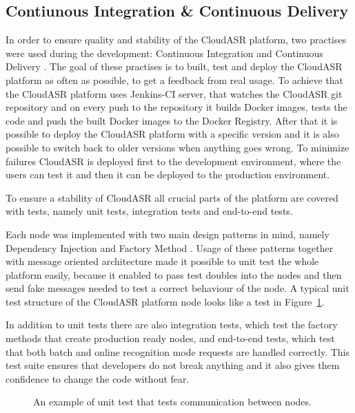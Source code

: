 \subsection{Contiunous Integration \& Continuous Delivery}
In order to ensure quality and stability of the CloudASR platform,
  two practises were used during the development:
  Continuous Integration \cite{fowler2006continuous} and Continuous Delivery \cite{humble2010continuous}.
The goal of these practises is to built, test and deploy the CloudASR platform as often as possible,
  to get a feedback from real usage.
To achieve that the CloudASR platform uses Jenkins-CI server,
  that watches the CloudASR git repository
  and on every push to the repository it builds Docker images,
  tests the code
  and push the built Docker images to the Docker Registry.
After that it is possible to deploy the CloudASR platform with a specific version
  and it is also possible to switch back to older versions when anything goes wrong.
To minimize failures CloudASR is deployed first to the development environment,
  where the users can test it
  and then it can be deployed to the production environment.


To ensure a stability of CloudASR all crucial parts of the platform are covered with tests,
  namely unit tests, integration tests and end-to-end tests.

Each node was implemented with two main design patterns in mind, namely Dependency Injection \cite{fowler2004inversion} and Factory Method \cite{gamma1993design}.
Usage of these patterns together with message oriented architecture made it possible to unit test the whole platform easily,
  because it enabled to pass test doubles into the nodes
  and then send fake messages needed to test a correct behaviour of the node.
A typical unit test structure of the CloudASR platform node looks like a test in Figure~\ref{fig:unit-test}.

In addition to unit tests there are also integration tests,
  which test the factory methods that create production ready nodes,
  and end-to-end tests,
  which test that both batch and online recognition mode requests are handled correctly.
This test suite ensures that developers do not break anything
  and it also gives them confidence to change the code without fear.

\begin{figure}[h]
  

  \caption{An example of unit test that tests communication between nodes.}
  \label{fig:unit-test}
\end{figure}


